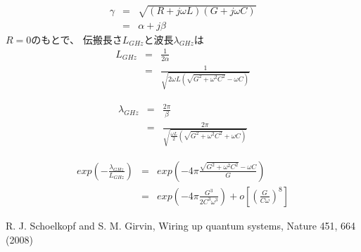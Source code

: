 \documentclass[11pt,a4paper]{jsarticle}
\begin{document}

\begin{eqnarray}
γ &=& \sqrt{(R+j\omega L)(G+j\omega C)}\\
  &=& \alpha +j\beta
\end{eqnarray}
$R=0$のもとで、 伝搬長さ$L_{GHz}$と波長$\lambda_{ GHz}$は
\begin{eqnarray}
L _{GHz} &=&\frac{1}{2\alpha}\\
&=& \frac{1}{\sqrt{2\omega L(\sqrt{G^2+\omega^2 C^2} -\omega C)}}
\end{eqnarray}

\begin{eqnarray}
\lambda_{GHz} &=&\frac{2\pi}{\beta}\\
&=& \frac{2\pi}{\sqrt{\frac{\omega L}{2}(\sqrt{G^2+\omega^2 C^2} +\omega C)}}
\end{eqnarray}

\begin{eqnarray}
exp(-\frac{\lambda_{GHz}}{L _{GHz}}) &=& exp(-4\pi \frac{\sqrt{G^2+\omega^2 C^2} - \omega C}{G})\\
&=& exp(-4\pi \frac{G^3}{2C^3\omega^3}) +o[(\frac{G}{C\omega})^8]
\end{eqnarray}

\begin{thebibliography}{9}
 R. J. Schoelkopf and S. M. Girvin, Wiring up quantum systems, Nature 451, 664 (2008)
\end{thebibliography}
\end{document}
